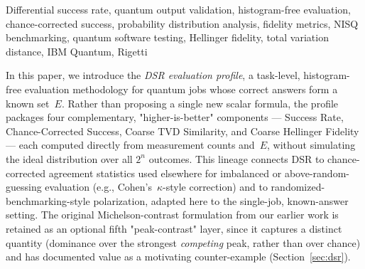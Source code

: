 \begin{IEEEkeywords}
Differential success rate, quantum output validation, histogram-free evaluation, chance-corrected success, probability distribution analysis, fidelity metrics, NISQ benchmarking, quantum software testing, Hellinger fidelity, total variation distance, IBM Quantum, Rigetti
\end{IEEEkeywords}



In this paper, we introduce the \emph{DSR evaluation profile}, a task-level, histogram-free evaluation methodology for quantum jobs whose correct answers form a known set~$E$. Rather than proposing a single new scalar formula, the profile packages four complementary, "higher-is-better" components --- Success Rate, Chance-Corrected Success, Coarse TVD Similarity, and Coarse Hellinger Fidelity --- each computed directly from measurement counts and~$E$, without simulating the ideal distribution over all $2^n$ outcomes. This lineage connects DSR to chance-corrected agreement statistics used elsewhere for imbalanced or above-random-guessing evaluation (e.g., Cohen's~$\kappa$-style correction) and to randomized-benchmarking-style polarization, adapted here to the single-job, known-answer setting. The original Michelson-contrast formulation from our earlier work is retained as an optional fifth "peak-contrast" layer, since it captures a distinct quantity (dominance over the strongest \emph{competing} peak, rather than over chance) and has documented value as a motivating counter-example (Section~\ref{sec:dsr}).

